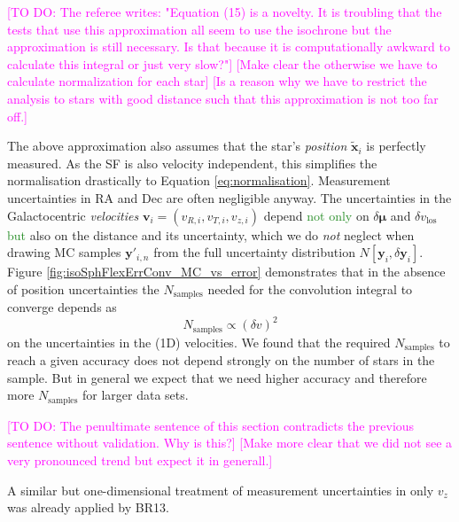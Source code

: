 \documentclass[iop,revtex4]{emulateapj}
\newcommand{\vect}[1]{\boldsymbol{#1}}
\newcommand{\NEW}[1]{\textcolor{ForestGreen}{#1}}
\newcommand{\Wilma}[1]{\textcolor{Magenta}{#1}}
\newcommand{\OLD}[1]{}
\begin{document}
\Wilma{[TO DO: The referee writes: "Equation (15) is a novelty. It is troubling that the tests that use this approximation all seem to use the isochrone but the approximation is still necessary. Is that because it is computationally awkward to calculate this integral or just very slow?"] [Make clear the otherwise we have to calculate normalization for each star] [Is a reason why we have to restrict the analysis to stars with good distance such that this approximation is not too far off.]}

The above approximation also assumes that the star's \emph{position} $\tilde{\vect{x}}_i$ is perfectly measured. As the SF is also velocity independent, this simplifies the normalisation drastically to Equation \eqref{eq:normalisation}. Measurement uncertainties in $\mathrm{RA}$ and $\mathrm{Dec}$ are often negligible anyway. The uncertainties in the Galactocentric \emph{velocities} $\vect{v}_i = (v_{R,i},v_{T,i},v_{z,i})$ depend \OLD{besides}\NEW{not only} on $\delta \vect{\mu}$ and $\delta v_\text{los}$ \NEW{but} also on the distance and its uncertainty, which we do \emph{not} neglect when drawing MC samples $\vect{y}'_{i,n}$ from the full uncertainty distribution $N[\vect{y}_i,\delta \vect{y}_i]$. Figure \ref{fig:isoSphFlexErrConv_MC_vs_error} demonstrates that in the absence of position uncertainties the $N_\text{samples}$ needed for the convolution integral to converge depends as
\begin{equation*}
N_\text{samples} \propto \left( \delta v \right)^2
\end{equation*}
on the uncertainties in the (1D) velocities. We found that the required $N_\text{samples}$ to reach a given accuracy does not depend strongly on the number of stars in the sample. But in general we expect that we need higher accuracy and therefore more $N_\text{samples}$ for larger data sets.

\Wilma{[TO DO: The penultimate sentence of this section contradicts the previous sentence without validation. Why is this?] [Make more clear that we did not see a very pronounced trend but expect it in generall.]}

A similar but one-dimensional treatment of measurement uncertainties in only $v_z$ was already applied by BR13.

\end{document}
